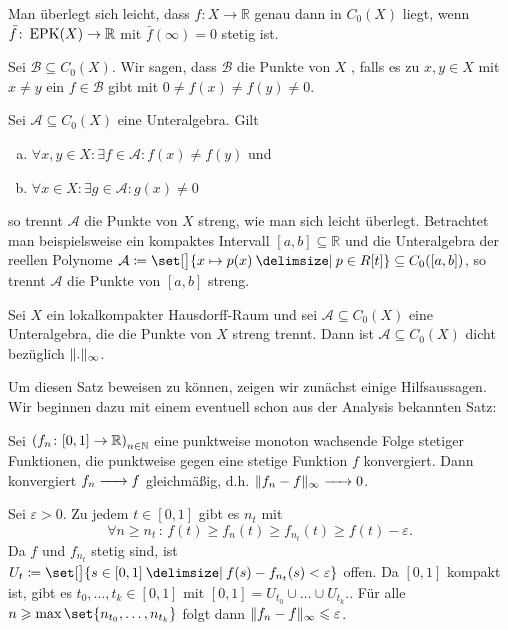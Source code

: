 Man überlegt sich leicht, dass $f \colon X \to \mathbb{R}$ genau dann in $C_0(X)$ liegt, wenn $\bar{f} \colon \EPK(X) \to \mathbb{R}$ mit $\bar{f}(\infty)=0$ stetig ist.

\begin{definition}[{name=[Punkte streng trennen]}]
	Sei $\mathcal{B} \subseteq C_0(X) $. 
	Wir sagen, dass $\mathcal{B}$ die Punkte von $X$ , falls es zu $x,y \in X$ mit $ x \neq y$ ein $f \in \mathcal{B}$ gibt 
	mit $0 \neq f(x) \neq f(y) \neq 0$.
\end{definition}

Sei $\mathcal{A} \subseteq C_0(X) $ eine Unteralgebra. Gilt
\begin{enumerate}[a)]
	\item $\forall x,y \in X : \exists f \in \mathcal{A}  : f(x) \neq f(y)$ und
	\item $\forall x \in X : \exists g \in \mathcal{A} : g(x) \neq 0 $
\end{enumerate}
so trennt $\mathcal{A}$ die Punkte von $X$ streng, wie man sich leicht überlegt.
Betrachtet man beispielsweise ein kompaktes Intervall $[a,b] \subseteq \mathbb{R}$ und die Unteralgebra der reellen Polynome $\mathcal{A} \coloneqq \set[\big]{x \mapsto p(x) \given p \in R[t]} \subseteq C_0([a,b])$, so trennt $\mathcal{A}$ die Punkte von $[a,b]$ streng.

\begin{satz}[{name={Stone-Weierstraß}},label=satz:stone-weier]
	Sei $X$ ein lokalkompakter Hausdorff-Raum und sei $\mathcal{A} \subseteq C_0(X)$ eine Unteralgebra, die die Punkte von $X$ streng trennt. 
	Dann ist $\mathcal{A} \subseteq C_0(X)$ dicht bezüglich $\norm{.}_\infty$.
\end{satz}

Um diesen Satz beweisen zu können, zeigen wir zunächst einige Hilfsaussagen.
Wir beginnen dazu mit einem eventuell schon aus der Analysis bekannten Satz:

\begin{satz}[{name={Dini}},label=satz:dini]
	Sei $\enbrace*{f_n \colon [0,1] \to \mathbb{R}}_{n \in \mathbb{N}}$ eine punktweise monoton wachsende Folge stetiger Funktionen, die punktweise gegen eine stetige Funktion $f$ konvergiert. 
	Dann konvergiert $f_n \grenzw{} f$ gleichmäßig, d.h. $\norm{f_n -f}_\infty \grenzw{} 0$.
\end{satz}
\begin{beweis}
	Sei $\varepsilon >0$. Zu jedem $t \in [0,1]$ gibt es $n_t$ mit 
	\[
		\forall n\ge n_t \, : \, f(t) \ge f_n(t) \ge f_{n_t}(t) \ge f(t) - \varepsilon. 
	\]
	Da $f$ und $f_{n_t}$ stetig sind, ist $U_t \coloneqq \set[\big]{{s \in [0,1]} \given f(s) - f_{n_t}(s) < \varepsilon} $ offen. 
	Da $[0,1]$ kompakt ist, gibt es $t_0, \ldots , t_k \in [0,1]$ mit 
	\(
		[0,1] = U_{t_0} \cup \ldots \cup U_{t_k}.
	\).
	Für alle $n \ge \max \set{n_{t_0}, \ldots , n_{t_k}} $ folgt dann
	\(
		\norm{f_n - f}_\infty \le \varepsilon
	\).
\end{beweis}

